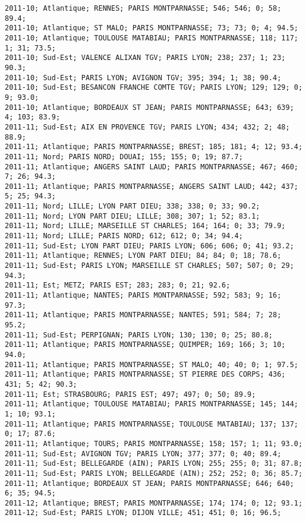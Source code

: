 \documentclass{article}
\begin{document}
\begin{Verbatim}[commandchars=\\\{\}]
2011-10; Atlantique; RENNES; PARIS MONTPARNASSE; 546; 546; 0; 58; 89.4; 
2011-10; Atlantique; ST MALO; PARIS MONTPARNASSE; 73; 73; 0; 4; 94.5; 
2011-10; Atlantique; TOULOUSE MATABIAU; PARIS MONTPARNASSE; 118; 117; 1; 31; 73.5; 
2011-10; Sud-Est; VALENCE ALIXAN TGV; PARIS LYON; 238; 237; 1; 23; 90.3; 
2011-10; Sud-Est; PARIS LYON; AVIGNON TGV; 395; 394; 1; 38; 90.4; 
2011-10; Sud-Est; BESANCON FRANCHE COMTE TGV; PARIS LYON; 129; 129; 0; 9; 93.0; 
2011-10; Atlantique; BORDEAUX ST JEAN; PARIS MONTPARNASSE; 643; 639; 4; 103; 83.9; 
2011-11; Sud-Est; AIX EN PROVENCE TGV; PARIS LYON; 434; 432; 2; 48; 88.9; 
2011-11; Atlantique; PARIS MONTPARNASSE; BREST; 185; 181; 4; 12; 93.4; 
2011-11; Nord; PARIS NORD; DOUAI; 155; 155; 0; 19; 87.7; 
2011-11; Atlantique; ANGERS SAINT LAUD; PARIS MONTPARNASSE; 467; 460; 7; 26; 94.3; 
2011-11; Atlantique; PARIS MONTPARNASSE; ANGERS SAINT LAUD; 442; 437; 5; 25; 94.3; 
2011-11; Nord; LILLE; LYON PART DIEU; 338; 338; 0; 33; 90.2; 
2011-11; Nord; LYON PART DIEU; LILLE; 308; 307; 1; 52; 83.1; 
2011-11; Nord; LILLE; MARSEILLE ST CHARLES; 164; 164; 0; 33; 79.9; 
2011-11; Nord; LILLE; PARIS NORD; 612; 612; 0; 34; 94.4; 
2011-11; Sud-Est; LYON PART DIEU; PARIS LYON; 606; 606; 0; 41; 93.2; 
2011-11; Atlantique; RENNES; LYON PART DIEU; 84; 84; 0; 18; 78.6; 
2011-11; Sud-Est; PARIS LYON; MARSEILLE ST CHARLES; 507; 507; 0; 29; 94.3; 
2011-11; Est; METZ; PARIS EST; 283; 283; 0; 21; 92.6; 
2011-11; Atlantique; NANTES; PARIS MONTPARNASSE; 592; 583; 9; 16; 97.3; 
2011-11; Atlantique; PARIS MONTPARNASSE; NANTES; 591; 584; 7; 28; 95.2; 
2011-11; Sud-Est; PERPIGNAN; PARIS LYON; 130; 130; 0; 25; 80.8; 
2011-11; Atlantique; PARIS MONTPARNASSE; QUIMPER; 169; 166; 3; 10; 94.0; 
2011-11; Atlantique; PARIS MONTPARNASSE; ST MALO; 40; 40; 0; 1; 97.5; 
2011-11; Atlantique; PARIS MONTPARNASSE; ST PIERRE DES CORPS; 436; 431; 5; 42; 90.3; 
2011-11; Est; STRASBOURG; PARIS EST; 497; 497; 0; 50; 89.9; 
2011-11; Atlantique; TOULOUSE MATABIAU; PARIS MONTPARNASSE; 145; 144; 1; 10; 93.1; 
2011-11; Atlantique; PARIS MONTPARNASSE; TOULOUSE MATABIAU; 137; 137; 0; 17; 87.6; 
2011-11; Atlantique; TOURS; PARIS MONTPARNASSE; 158; 157; 1; 11; 93.0; 
2011-11; Sud-Est; AVIGNON TGV; PARIS LYON; 377; 377; 0; 40; 89.4; 
2011-11; Sud-Est; BELLEGARDE (AIN); PARIS LYON; 255; 255; 0; 31; 87.8; 
2011-11; Sud-Est; PARIS LYON; BELLEGARDE (AIN); 252; 252; 0; 36; 85.7; 
2011-11; Atlantique; BORDEAUX ST JEAN; PARIS MONTPARNASSE; 646; 640; 6; 35; 94.5; 
2011-12; Atlantique; BREST; PARIS MONTPARNASSE; 174; 174; 0; 12; 93.1; 
2011-12; Sud-Est; PARIS LYON; DIJON VILLE; 451; 451; 0; 16; 96.5; 

\end{Verbatim}
\end{document}
